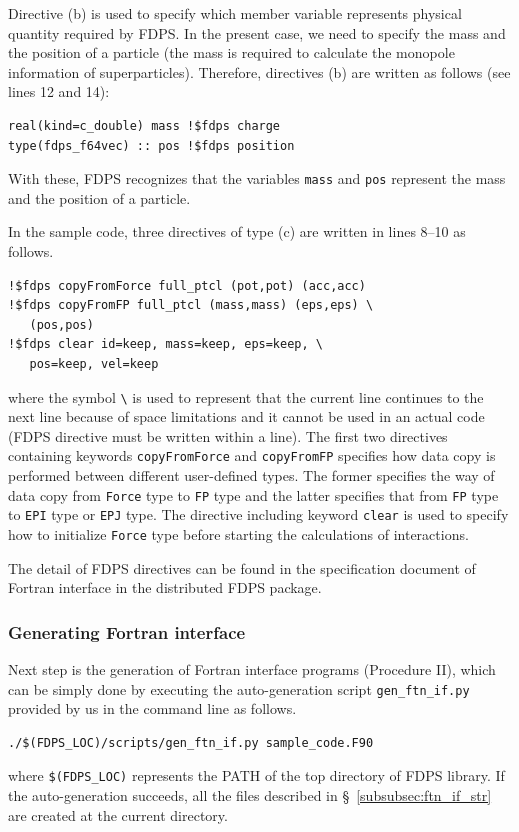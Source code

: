 \documentclass[twocolumn,useamsfonts]{pasj01}
\begin{document}
Directive (b) is used to specify which member variable represents physical quantity required by FDPS. In the present case, we need to specify the mass and the position of a particle (the mass is required to calculate the monopole information of superparticles). Therefore, directives (b) are written as follows (see lines 12 and 14): 
\begin{verbatim}
real(kind=c_double) mass !$fdps charge
type(fdps_f64vec) :: pos !$fdps position
\end{verbatim}
With these, FDPS recognizes that the variables \texttt{mass} and \texttt{pos} represent the mass and the position of a particle. 

In the sample code, three directives of type (c) are written in lines 8--10 as follows.
{\footnotesize
\begin{verbatim}
!$fdps copyFromForce full_ptcl (pot,pot) (acc,acc)
!$fdps copyFromFP full_ptcl (mass,mass) (eps,eps) \
   (pos,pos) 
!$fdps clear id=keep, mass=keep, eps=keep, \
   pos=keep, vel=keep
\end{verbatim}
}
where the symbol \texttt{\textbackslash} is used to represent that the current line continues to the next line because of space limitations and it cannot be used in an actual code (FDPS directive must be written within a line). The first two directives containing keywords \texttt{copyFromForce} and \texttt{copyFromFP} specifies how data copy is performed between different user-defined types. The former specifies the way of data copy from \texttt{Force} type to \texttt{FP} type and the latter specifies that from \texttt{FP} type to \texttt{EPI} type or \texttt{EPJ} type. The directive including keyword \texttt{clear} is used to specify how to initialize \texttt{Force} type before starting the calculations of interactions. 

The detail of FDPS directives can be found in the specification document of Fortran interface in the distributed FDPS package.

\subsubsection{Generating Fortran interface}
\label{subsubsec:gen_ftn_if}
Next step is the generation of Fortran interface programs (Procedure II), which can be simply done by executing the auto-generation script \texttt{gen\_ftn\_if.py} provided by us in the command line as follows.
\begin{verbatim}
./$(FDPS_LOC)/scripts/gen_ftn_if.py sample_code.F90
\end{verbatim}
where \texttt{\$(FDPS\_LOC)} represents the PATH of the top directory of FDPS library. If the auto-generation succeeds, all the files described in \S~\ref{subsubsec:ftn_if_str} are created at the current directory.
\end{document}
